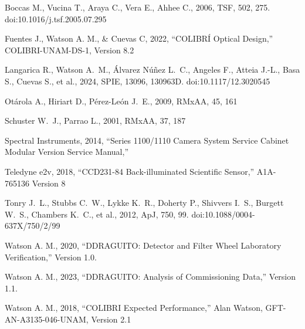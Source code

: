 \clearpage
\begin{thebibliography}{}
\raggedright

 Boccas M., Vucina T., Araya C., Vera E., Ahhee C., 2006, TSF, 502, 275. doi:10.1016/j.tsf.2005.07.295

Fuentes J., Watson A. M., \& Cuevas C, 2022, “COLIBRÍ Optical Design,” COLIBRI-UNAM-DS-1, Version 8.2

 Langarica R., Watson A.~M., {\'A}lvarez N{\'u}{\~n}ez L.~C., Angeles F., Atteia J.-L., Basa S., Cuevas S., et al., 2024, SPIE, 13096, 130963D. doi:10.1117/12.3020545


 Ot{\'a}rola A., Hiriart D., P{\'e}rez-Le{\'o}n J.~E., 2009, RMxAA, 45, 161

 Schuster W.~J., Parrao L., 2001, RMxAA, 37, 187

Spectral Instruments, 2014, “Series 1100/1110 Camera System Service Cabinet Modular Version Service Manual,”

Teledyne e2v, 2018, “CCD231-84 Back-illuminated Scientific Sensor,” A1A-765136 Version 8

 Tonry J.~L., Stubbs C.~W., Lykke K.~R., Doherty P., Shivvers I.~S., Burgett W.~S., Chambers K.~C., et al., 2012, ApJ, 750, 99. doi:10.1088/0004-637X/750/2/99

Watson A. M., 2020, “DDRAGUITO: Detector and Filter Wheel Laboratory Verification,” Version 1.0.

Watson A. M., 2023, “DDRAGUITO: Analysis of Commissioning Data,” Version 1.1.

Watson A. M., 2018, “COLIBRI Expected Performance,” Alan Watson, GFT-AN-A3135-046-UNAM, Version 2.1

\end{thebibliography}
